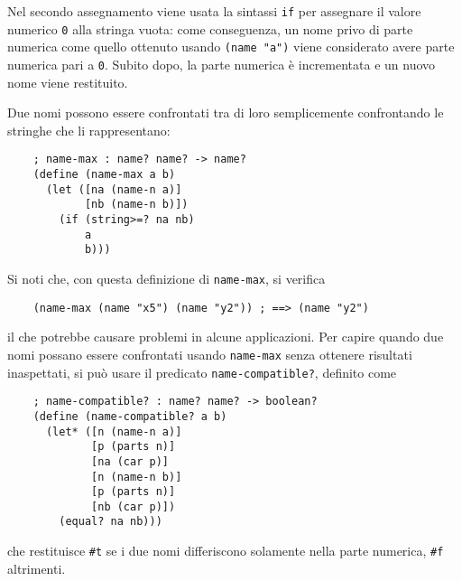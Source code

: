 Nel secondo assegnamento viene usata la sintassi \lstinline{if} per
assegnare il valore numerico \lstinline{0} alla stringa vuota: come
conseguenza, un nome privo di parte numerica come quello ottenuto usando
\lstinline{(name "a")} viene considerato avere parte numerica pari a
\lstinline{0}. Subito dopo, la parte numerica \`e incrementata e un nuovo
nome viene restituito.

Due nomi possono essere confrontati tra di loro semplicemente confrontando
le stringhe che li rappresentano:

\begin{lstlisting}
    ; name-max : name? name? -> name?
    (define (name-max a b)
      (let ([na (name-n a)]
            [nb (name-n b)])
        (if (string>=? na nb)
            a
            b)))
\end{lstlisting}

Si noti che, con questa definizione di \lstinline{name-max}, si verifica

\begin{lstlisting}
    (name-max (name "x5") (name "y2")) ; ==> (name "y2")
\end{lstlisting}

il che potrebbe causare problemi in alcune applicazioni. Per capire quando
due nomi possano essere confrontati usando \lstinline{name-max} senza
ottenere risultati inaspettati, si pu\`o usare il predicato
\lstinline{name-compatible?}, definito come

\begin{lstlisting}
    ; name-compatible? : name? name? -> boolean?
    (define (name-compatible? a b)
      (let* ([n (name-n a)]
             [p (parts n)]
             [na (car p)]
             [n (name-n b)]
             [p (parts n)]
             [nb (car p)])
        (equal? na nb)))
\end{lstlisting}

che restituisce \lstinline{#t} se i due nomi differiscono solamente nella
parte numerica, \lstinline{#f} altrimenti.
